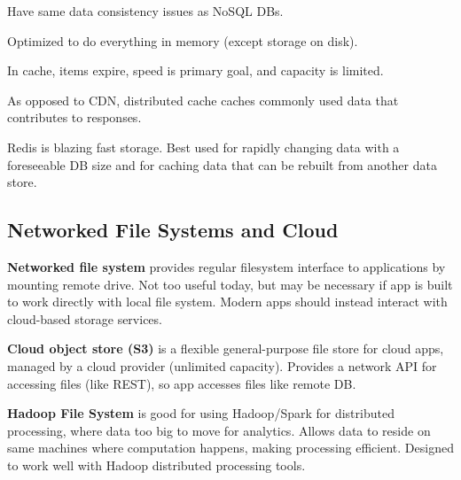 \documentclass[11pt]{article}
\begin{document}
Have same data consistency issues as NoSQL DBs.

Optimized to do everything in memory (except storage on disk).

In cache, items expire, speed is primary goal, and capacity is limited.

As opposed to CDN, distributed cache caches commonly used data that contributes to responses.

Redis is blazing fast storage.
Best used for rapidly changing data with a foreseeable DB size and for caching data that can be rebuilt
from another data store.
\subsection{Networked File Systems and Cloud}
\label{sec:org2ff7690}
\textbf{Networked file system} provides regular filesystem interface to applications by mounting remote drive.
Not too useful today, but may be necessary if app is built to work directly with local file system.
Modern apps should instead interact with cloud-based storage services.

\textbf{Cloud object store (S3)} is a flexible general-purpose file store for cloud apps, managed by a cloud
provider (unlimited capacity).
Provides a network API for accessing files (like REST), so app accesses files like remote DB.

\textbf{Hadoop File System} is good for using Hadoop/Spark for distributed processing, where data too big
to move for analytics.
Allows data to reside on same machines where computation happens, making processing efficient.
Designed to work well with Hadoop distributed processing tools.
\end{document}
